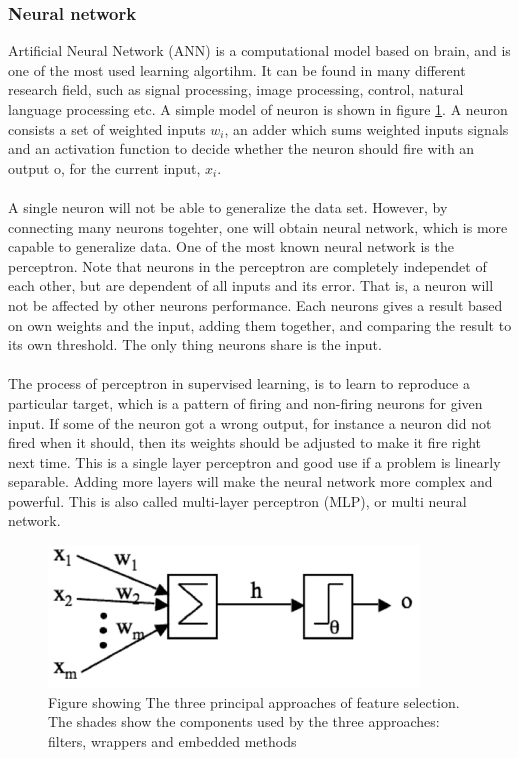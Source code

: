 \documentclass[USenglish]{ifimaster}  %
\begin{document}
\subsubsection{Neural network}
Artificial Neural Network (ANN) is a computational model based on brain, and is one of the most used learning algortihm. It can be found in many different research field, such as signal processing, image processing, control, natural language processing etc. A simple model of neuron is shown in figure \ref{fig:NN}. A neuron consists a set of weighted inputs $w_i$, an adder which sums weighted inputs signals and an activation function to decide whether the neuron should fire with an output o, for the current input, $x_i$. 
\\
\\
A single neuron will not be able to generalize the data set. However, by connecting many neurons togehter, one will obtain neural network, which is more capable to generalize data. One of the most known neural network is the perceptron. Note that neurons in the perceptron are completely independet of each other, but are dependent of all inputs and its error. That is, a neuron will not be affected by other neurons performance. Each neurons gives a result based on own weights and the input, adding them together, and comparing the result to its own threshold. The only thing neurons share is the input. 
\\
\\
The process of perceptron in supervised learning, is to learn to reproduce a particular target, which is a pattern of firing and non-firing neurons for given input. If some of the neuron got a wrong output, for instance a neuron did not fired when it should, then its weights should be adjusted to make it fire right next time. This is a single layer perceptron and good use if a problem is linearly separable. Adding more layers will make the neural network more complex and powerful. This is also called multi-layer perceptron (MLP), or multi neural network.


\begin{figure}[h]
    \centering
    \includegraphics[scale=0.9]{Figures/neuron.PNG}
    \caption{Figure showing The three principal approaches of feature selection. The shades show the components used by the three approaches: filters, wrappers and embedded methods \cite{Guyon2006}}
    \label{fig:NN}
\end{figure}
\end{document}
